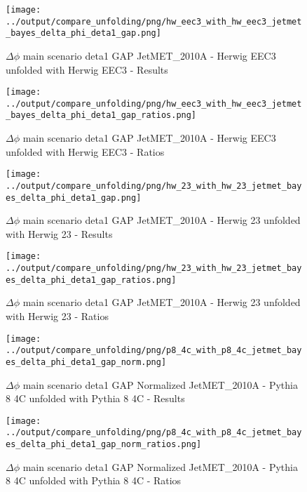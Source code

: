 \documentclass[11pt]{book}
\begin{document}
\begin{figure}[ht]
\centering
\texttt{[image: ../output/compare\_unfolding/png/hw\_eec3\_with\_hw\_eec3\_jetmet\_bayes\_delta\_phi\_deta1\_gap.png]}
\caption{$\Delta\phi$ main scenario deta1 GAP JetMET\_2010A - Herwig EEC3 unfolded with Herwig EEC3 - Results}
\label{hw_eec3_hw_eec3_jetmet_bayes_delta_phi_deta1_gap_a}
\end{figure}

\begin{figure}[ht]
\centering
\texttt{[image: ../output/compare\_unfolding/png/hw\_eec3\_with\_hw\_eec3\_jetmet\_bayes\_delta\_phi\_deta1\_gap\_ratios.png]}
\caption{$\Delta\phi$ main scenario deta1 GAP JetMET\_2010A - Herwig EEC3 unfolded with Herwig EEC3 - Ratios}
\label{hw_eec3_hw_eec3_jetmet_bayes_delta_phi_deta1_gap_b}
\end{figure}

\begin{figure}[ht]
\centering
\texttt{[image: ../output/compare\_unfolding/png/hw\_23\_with\_hw\_23\_jetmet\_bayes\_delta\_phi\_deta1\_gap.png]}
\caption{$\Delta\phi$ main scenario deta1 GAP JetMET\_2010A - Herwig 23 unfolded with Herwig 23 - Results}
\label{hw_23_hw_23_jetmet_bayes_delta_phi_deta1_gap_a}
\end{figure}

\begin{figure}[ht]
\centering
\texttt{[image: ../output/compare\_unfolding/png/hw\_23\_with\_hw\_23\_jetmet\_bayes\_delta\_phi\_deta1\_gap\_ratios.png]}
\caption{$\Delta\phi$ main scenario deta1 GAP JetMET\_2010A - Herwig 23 unfolded with Herwig 23 - Ratios}
\label{hw_23_hw_23_jetmet_bayes_delta_phi_deta1_gap_b}
\end{figure}


\begin{figure}[ht]
\centering
\texttt{[image: ../output/compare\_unfolding/png/p8\_4c\_with\_p8\_4c\_jetmet\_bayes\_delta\_phi\_deta1\_gap\_norm.png]}
\caption{$\Delta\phi$ main scenario deta1 GAP Normalized JetMET\_2010A - Pythia 8 4C unfolded with Pythia 8 4C - Results}
\label{p8_p8_jetmet_bayes_delta_phi_deta1_gap_norm_a}
\end{figure}

\begin{figure}[ht]
\centering
\texttt{[image: ../output/compare\_unfolding/png/p8\_4c\_with\_p8\_4c\_jetmet\_bayes\_delta\_phi\_deta1\_gap\_norm\_ratios.png]}
\caption{$\Delta\phi$ main scenario deta1 GAP Normalized JetMET\_2010A - Pythia 8 4C unfolded with Pythia 8 4C - Ratios}
\label{p8_p8_jetmet_bayes_delta_phi_deta1_gap_norm_b}
\end{figure}
\end{document}
